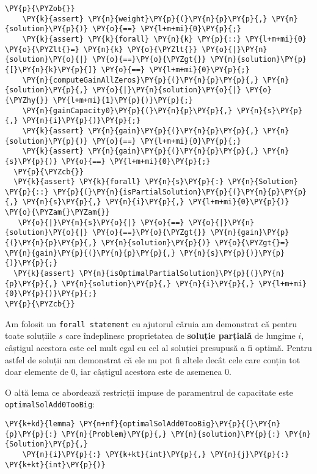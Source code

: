 \begin{sloppypar}
\begin{Verbatim}[commandchars=\\\{\}]
  \PY{p}{\PYZob{}}
    \PY{k}{assert} \PY{n}{weight}\PY{p}{(}\PY{n}{p}\PY{p}{,} \PY{n}{solution}\PY{p}{)} \PY{o}{==} \PY{l+m+mi}{0}\PY{p}{;}
    \PY{k}{assert} \PY{k}{forall} \PY{n}{k} \PY{p}{::} \PY{l+m+mi}{0} \PY{o}{\PYZlt{}=} \PY{n}{k} \PY{o}{\PYZlt{}} \PY{o}{|}\PY{n}{solution}\PY{o}{|} \PY{o}{==}\PY{o}{\PYZgt{}} \PY{n}{solution}\PY{p}{[}\PY{n}{k}\PY{p}{]} \PY{o}{==} \PY{l+m+mi}{0}\PY{p}{;}
    \PY{n}{computeGainAllZeros}\PY{p}{(}\PY{n}{p}\PY{p}{,} \PY{n}{solution}\PY{p}{,} \PY{o}{|}\PY{n}{solution}\PY{o}{|} \PY{o}{\PYZhy{}} \PY{l+m+mi}{1}\PY{p}{)}\PY{p}{;}
    \PY{n}{gainCapacity0}\PY{p}{(}\PY{n}{p}\PY{p}{,} \PY{n}{s}\PY{p}{,} \PY{n}{i}\PY{p}{)}\PY{p}{;}
    \PY{k}{assert} \PY{n}{gain}\PY{p}{(}\PY{n}{p}\PY{p}{,} \PY{n}{solution}\PY{p}{)} \PY{o}{==} \PY{l+m+mi}{0}\PY{p}{;}
    \PY{k}{assert} \PY{n}{gain}\PY{p}{(}\PY{n}{p}\PY{p}{,} \PY{n}{s}\PY{p}{)} \PY{o}{==} \PY{l+m+mi}{0}\PY{p}{;}
  \PY{p}{\PYZcb{}}
  \PY{k}{assert} \PY{k}{forall} \PY{n}{s}\PY{p}{:} \PY{n}{Solution} \PY{p}{::} \PY{p}{(}\PY{n}{isPartialSolution}\PY{p}{(}\PY{n}{p}\PY{p}{,} \PY{n}{s}\PY{p}{,} \PY{n}{i}\PY{p}{,} \PY{l+m+mi}{0}\PY{p}{)} \PY{o}{\PYZam{}\PYZam{}} 
   \PY{o}{|}\PY{n}{s}\PY{o}{|} \PY{o}{==} \PY{o}{|}\PY{n}{solution}\PY{o}{|} \PY{o}{==}\PY{o}{\PYZgt{}} \PY{n}{gain}\PY{p}{(}\PY{n}{p}\PY{p}{,} \PY{n}{solution}\PY{p}{)} \PY{o}{\PYZgt{}=} \PY{n}{gain}\PY{p}{(}\PY{n}{p}\PY{p}{,} \PY{n}{s}\PY{p}{)}\PY{p}{)}\PY{p}{;}
  \PY{k}{assert} \PY{n}{isOptimalPartialSolution}\PY{p}{(}\PY{n}{p}\PY{p}{,} \PY{n}{solution}\PY{p}{,} \PY{n}{i}\PY{p}{,} \PY{l+m+mi}{0}\PY{p}{)}\PY{p}{;}
\PY{p}{\PYZcb{}}
\end{Verbatim}
\hspace{4mm} Am folosit un \texttt{forall statement} cu ajutorul căruia am demonstrat că pentru toate soluțiile $s$ care îndeplinesc proprietatea de \textbf{soluție parțială} de lungime $i$, câștigul acestora este cel mult egal cu cel al soluției presupusă a fi optimă. Pentru astfel de soluții am demonstrat că ele nu pot fi altele decât cele care conțin tot doar elemente de 0, iar câștigul acestora este de asemenea 0. \par
O altă lema ce abordează restricții impuse de paramentrul de capacitate este \texttt{optimalSolAdd0TooBig}:
\begin{Verbatim}[commandchars=\\\{\}]
\PY{k+kd}{lemma} \PY{n+nf}{optimalSolAdd0TooBig}\PY{p}{(}\PY{n}{p}\PY{p}{:} \PY{n}{Problem}\PY{p}{,} \PY{n}{solution}\PY{p}{:} \PY{n}{Solution}\PY{p}{,} 
    \PY{n}{i}\PY{p}{:} \PY{k+kt}{int}\PY{p}{,} \PY{n}{j}\PY{p}{:} \PY{k+kt}{int}\PY{p}{)}

\end{Verbatim}
\end{sloppypar}
